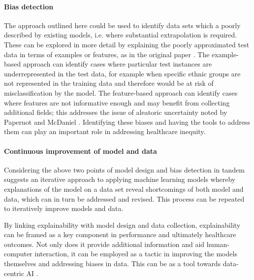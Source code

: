 \documentclass{article}
\begin{document}
\paragraph{Bias detection}
The approach outlined here could be used to identify data sets which a poorly described by existing models, i.e. where substantial extrapolation is required. These can be explored in more detail by explaining the poorly approximated test data in terms of examples or features, as in the original paper \cite{crabbe_explaining_2021}.
The example-based approach can identify cases where particular test instances are underrepresented in the test data, for example when specific ethnic groups are not represented in the training data and therefore would be at risk of misclassification by the model.
The feature-based approach can identify cases where features are not informative enough and may benefit from collecting additional fields; this addresses the issue of aleatoric uncertainty noted by Papernot and McDaniel \cite{papernot_deep_2018}. Identifying these biases and having the tools to address them can play an important role in addressing healthcare inequity.


\paragraph{Continuous improvement of model and data}
Considering the above two points of model design and bias detection in tandem suggests an iterative approach to applying machine learning models whereby explanations of the model on a data set reveal shortcomings of both model and data, which can in turn be addressed and revised. This process can be repeated to iteratively improve models and data.

By linking explainability with model design and data collection, explainability can be framed as a key component in performance and ultimately healthcare outcomes. Not only does it provide additional information and aid human-computer interaction, it can be employed as a tactic in improving the models themselves and addressing biases in data. This can be as a tool towards data-centric AI \cite{zha_data-centric_2023}.





\clearpage





\end{document}

